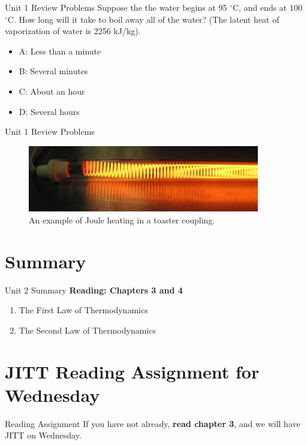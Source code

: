 \documentclass{beamer}
\begin{document}
\begin{frame}{Unit 1 Review Problems}
Suppose the the water begins at 95 $^{\circ}$C, and ends at 100 $^{\circ}$C.  How long will it take to boil away all of the water?  (The latent heat of vaporization of water is 2256 kJ/kg).
\begin{itemize}
\item A: Less than a minute
\item B: Several minutes
\item C: About an hour
\item D: Several hours
\end{itemize}
\end{frame}

\begin{frame}{Unit 1 Review Problems}
\begin{figure}
\centering
\includegraphics[width=0.9\textwidth]{figures/toaster.JPG}
\caption{\label{fig:toast} An example of Joule heating in a toaster coupling.}
\end{figure}
\end{frame}

\section{Summary}

\begin{frame}{Unit 2 Summary}
\textbf{Reading: Chapters 3 and 4}
\begin{enumerate}
\item The First Law of Thermodynamics
\item The Second Law of Thermodynamics
\end{enumerate}
\end{frame}

\section{JITT Reading Assignment for Wednesday}

\begin{frame}{Reading Assignment}
If you have not already, \textbf{read chapter 3}, and we will have JITT on Wednesday.
\end{frame}
\end{document}

